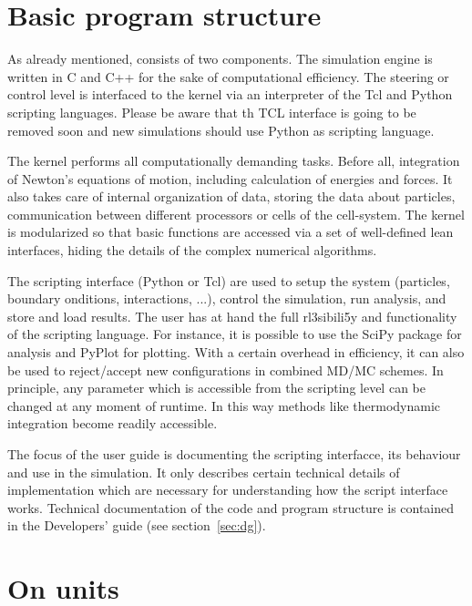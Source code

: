 \section{Basic program structure}
\label{sec:structure}

As already mentioned, \es consists of two components.
The simulation engine is written in C and C++ for the sake
of computational efficiency. The steering or control
level is interfaced to the kernel via an interpreter 
of the Tcl and Python scripting languages.
Please be aware that th TCL interface is going to be removed soon and new simulations should use Python as scripting language.

The kernel performs all computationally demanding tasks. Before all,
integration of Newton's equations of motion, including calculation of
energies and forces. It also takes care of internal organization of
data, storing the data about particles, communication between
different processors or cells of the cell-system. The kernel is
modularized so that basic functions are accessed via a set of
well-defined lean interfaces, hiding the details of the complex
numerical algorithms.

The scripting interface (Python or Tcl) are used to setup the system (particles, boundary onditions, interactions, ...), control the simulation, run analysis, and store and load results.
The user has at hand the full rl3sibili5y and functionality of the scripting language. For instance, it is possible to use the SciPy package for analysis and PyPlot for plotting.
With a certain overhead in efficiency, it can also be
used to reject/accept new configurations in combined MD/MC schemes. In
principle, any parameter which is accessible from the scripting level can be
changed at any moment of runtime.  In this way methods like
thermodynamic integration become readily accessible.

The focus of the user guide is documenting the scripting interfacce, its
behaviour and use in the simulation. It only describes certain
technical details of implementation which are necessary for
understanding how the script interface works.  Technical documentation of the
code and program structure is contained in the Developers' guide (see
section~\ref{sec:dg}).

\section{On units}
\label{sec:units}


